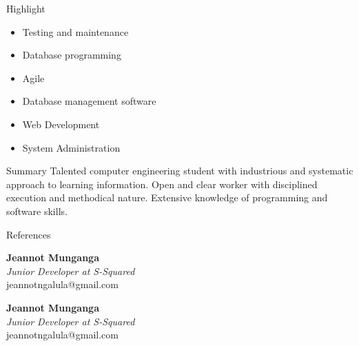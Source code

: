 \documentclass{resume} %
\begin{document}
\begin{rSection}{Highlight}
        \begin{multicols}{3}
        \begin{itemize}[noitemsep,topsep=-6pt]
            \item Testing and maintenance
            \item Database programming
        \end{itemize}
        \columnbreak
        \begin{itemize}[noitemsep,topsep=-6pt]
            \item Agile
            \item Database management software
        \end{itemize}

        \columnbreak

        \begin{itemize}[noitemsep,topsep=-6pt]
            \item Web Development
            \item System Administration
        \end{itemize}
        
        \end{multicols}
\end{rSection}


\begin{rSection}{Summary}
    Talented computer engineering student with industrious and systematic approach to learning information. Open and clear worker with disciplined execution and methodical nature. Extensive knowledge of programming and software skills.
\end{rSection}

\begin{rSection}{References}
        \begin{multicols}{2}

            \textbf{Jeannot Munganga} \\
            \textit{Junior Developer at S-Squared} \\
            jeannotngalula@gmail.com 

        \columnbreak

            \textbf{Jeannot Munganga} \\
            \textit{Junior Developer at S-Squared} \\
            jeannotngalula@gmail.com \\

        \end{multicols}
\end{rSection}
\end{document}
